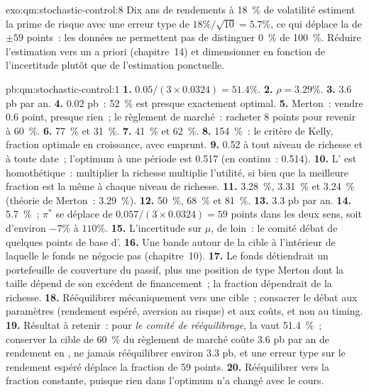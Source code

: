 \begin{solution}{exo:qm:stochastic-control:8}
Dix ans de rendements à 18~\% de volatilité estiment la prime de risque avec une erreur type de $18\%/\sqrt{10} = 5.7\%$, ce qui
déplace la  de $\pm 59$ points~: les données ne permettent pas de distinguer 0~\% de 100~\%. Réduire l'estimation vers un
a priori (chapitre~14) et dimensionner en fonction de l'incertitude plutôt que de l'estimation ponctuelle.
\end{solution}

\begin{solution}{pb:qm:stochastic-control:1}
\textbf{1.} $0.05/(3 \times 0.0324) = 51.4\%$.
\textbf{2.} $\rho = 3.29\%$.
\textbf{3.} 3.6 pb par an.
\textbf{4.} 0.02 pb~: 52~\% est presque exactement optimal.
\textbf{5.} Merton~: vendre 0.6 point, presque rien~; le règlement de marché~: racheter 8 points pour revenir à 60~\%.
\textbf{6.} 77~\% et 31~\%.
\textbf{7.} 41~\% et 62~\%.
\textbf{8.} 154~\%~: le critère de Kelly, fraction optimale en croissance, avec emprunt.
\textbf{9.} 0.52 à tout niveau de richesse et à toute date~; l'optimum à une période est 0.517 (en continu~: 0.514).
\textbf{10.} L' est homothétique~: multiplier la richesse multiplie l'utilité, si bien que la meilleure fraction est la même à chaque
niveau de richesse.
\textbf{11.} 3.28~\%, 3.31~\% et 3.24~\% (théorie de Merton~: 3.29~\%).
\textbf{12.} 50~\%, 68~\% et 81~\%.
\textbf{13.} 3.3 pb par an.
\textbf{14.} 5.7~\%~; $\pi^*$ se déplace de $0.057/(3 \times 0.0324) = 59$ points dans les deux sens, soit d'environ $-7\%$ à $110\%$.
\textbf{15.} L'incertitude sur $\mu$, de loin~: le comité débat de quelques points de base d'.
\textbf{16.} Une bande autour de la cible à l'intérieur de laquelle le fonds ne négocie pas (chapitre~10).
\textbf{17.} Le fonds détiendrait un portefeuille de couverture du passif, plus une position de type Merton dont la taille dépend de son
excédent de financement~; la fraction dépendrait de la richesse.
\textbf{18.} Rééquilibrer mécaniquement vers une cible~; consacrer le débat aux paramètres (rendement espéré, aversion au risque) et
aux coûts, et non au timing.
\textbf{19.} Résultat à retenir~: pour \emph{le comité de rééquilibrage}, la  vaut 51.4~\%~; conserver la cible de 60~\% du règlement de
marché coûte 3.6 pb par an de rendement en , ne jamais rééquilibrer environ 3.3 pb, et une erreur type sur
le rendement espéré déplace la fraction de 59 points.
\textbf{20.} Rééquilibrer vers la fraction constante, puisque rien dans l'optimum n'a changé avec le cours.
\end{solution}

